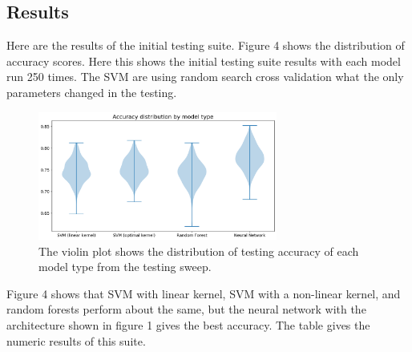 \documentclass[12pt]{article}
\begin{document}
\subsection{Results}

Here are the results of the initial testing suite. Figure 4 shows the distribution of accuracy scores. Here this shows the initial testing suite results with each model run 250 times. The SVM are using random search cross validation what the only parameters changed in the testing. 

\begin{figure}[H]
\centering
\includegraphics[width=0.7\textwidth]{testOut}
\caption{The violin plot shows the distribution of testing accuracy of each model type from the testing sweep.}
\end{figure}
Figure 4 shows that SVM with linear kernel, SVM with a non-linear kernel, and random forests perform about the same, but the neural network with the architecture shown in figure 1 gives the best accuracy. The table gives the numeric results of this suite.
\end{document}
